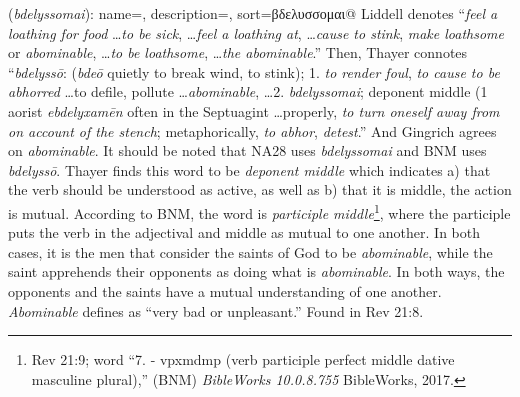 \item[Abominable,]

(\textit{bdelyssomai}):
{
    name=,
    description={},
    sort=βδελυσσομαι@
}
Liddell denotes ``\emph{feel a loathing for food} \ldots \emph{to be sick}, \ldots \emph{feel a loathing at}, \ldots \emph{cause to stink}, \emph{make loathsome} or \emph{abominable}, \ldots \emph{to be loathsome}, \ldots \emph{the abominable}.'' 
Then, Thayer connotes ``\emph{bdelyssō}: (\emph{bdeō} quietly to break wind, to stink);  1. \emph{to render foul}, \emph{to cause to be abhorred} \ldots to defile, pollute \ldots \emph{abominable}, \ldots 2. \emph{bdelyssomai}; deponent middle (1 aorist \emph{ebdelyxamēn} often in the Septuagint \ldots properly, \emph{to turn oneself away from on account of the stench}; metaphorically, \emph{to abhor}, \emph{detest}.'' 
And Gingrich agrees on \textit{abominable}. 
It should be noted that NA28 uses \emph{bdelyssomai} and BNM uses  \emph{bdelyssō}. Thayer finds this word to be \emph{deponent middle} which indicates a) that the verb should be understood as active, as well as b) that it is middle, the action is mutual. According to BNM, the word is \emph{participle middle}\footnote{Rev 21:9; word ``7.   - vpxmdmp (verb participle perfect middle dative masculine plural),'' (BNM) \emph{BibleWorks 10.0.8.755} BibleWorks, 2017.}, where the participle puts the verb in the adjectival and middle as mutual to one another. In both cases, it is the men that consider the saints of God to be \emph{abominable}, while the saint apprehends their opponents as doing what is \emph{abominable}. In both ways, the opponents and the saints have a mutual understanding of one another. \textit{Abominable} defines as ``very bad or unpleasant.''
Found in Rev 21:8.

